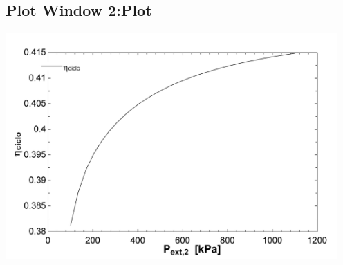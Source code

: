 \documentclass[10pt,fleqn]{article}
\theoremstyle{mytheoremstyle}
\theoremstyle{mytheoremstyle}
\theoremstyle{myproblemstyle}
\begin{document}
\begin{enumerate}
    \subsection*{Plot Window 2:\;Plot}
    {\centerline{\includegraphics[width=5.0in,keepaspectratio]{Taller2_P3.jpg}}}

\end{enumerate}
\end{document}
